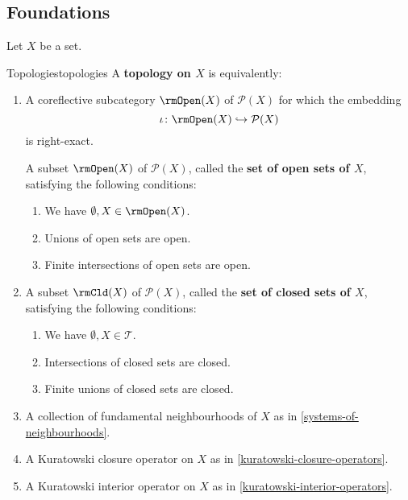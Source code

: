\subsection{Foundations}\label{subsection-topologies-foundations}
Let $X$ be a set.
\begin{definition}{Topologies}{topologies}%
    A \textbf{topology on $X$} is equivalently:%
    \begin{enumerate}
        \item\label{topologies-1}A coreflective subcategory $\rmOpen(X)$ of $\mathcal{P}(X)$ for which the embedding
            \[
                \iota%
                \colon%
                \rmOpen(X)%
                \hookrightarrow%
                \mathcal{P}(X)%
            \]%
            is right-exact.

            A subset $\rmOpen(X)$ of $\mathcal{P}(X)$, called the \textbf{set of open sets of $X$}, satisfying the following conditions:
            \begin{enumerate}
                \item\label{topologies-1-a}We have $\emptyset,X\in\rmOpen(X)$.%
                \item\label{topologies-1-b}Unions of open sets are open.
                \item\label{topologies-1-c}Finite intersections of open sets are open.
            \end{enumerate}
        \item\label{topologies-2}A subset $\rmCld(X)$ of $\mathcal{P}(X)$, called the \textbf{set of closed sets of $X$}, satisfying the following conditions:
            \begin{enumerate}
                \item\label{topologies-2-a}We have $\emptyset,X\in\mathcal{T}$.%
                \item\label{topologies-2-b}Intersections of closed sets are closed.
                \item\label{topologies-2-c}Finite unions of closed sets are closed.
            \end{enumerate}
        \item\label{topologies-3}A collection of fundamental neighbourhoods of $X$ as in  \cref{systems-of-neighbourhoods}.
        \item\label{topologies-4}A Kuratowski closure operator  on $X$ as in \cref{kuratowski-closure-operators}.
        \item\label{topologies-5}A Kuratowski interior operator on $X$ as in \cref{kuratowski-interior-operators}.
    \end{enumerate}
\end{definition}

